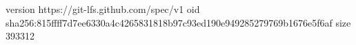 version https://git-lfs.github.com/spec/v1
oid sha256:815ffff7d7ee6330a4c4265831818b97c93ed190e949285279769b1676e5f6af
size 393312
